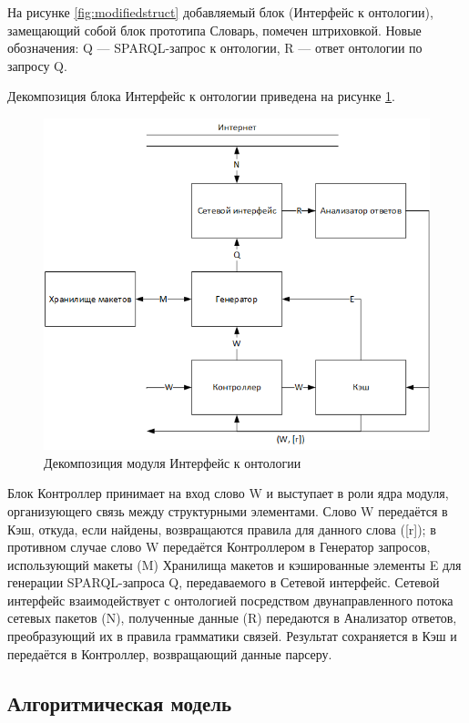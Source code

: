 На рисунке \ref{fig:modifiedstruct} добавляемый блок (Интерфейс к онтологии), замещающий собой блок прототипа Словарь, помечен штриховкой. Новые обозначения: Q --- SPARQL-запрос к онтологии, R --- ответ онтологии по запросу Q.

Декомпозиция блока Интерфейс к онтологии приведена на рисунке \ref{fig:decomposedstruct}.

\begin{figure}[H]
	\centering
		\includegraphics[scale=1.0]{images/decomposedstructure.png}
	\caption{\small Декомпозиция модуля Интерфейс к онтологии}
	\label{fig:decomposedstruct}
\end{figure}

Блок Контроллер принимает на вход слово W и выступает в роли ядра модуля, организующего связь между структурными элементами. Слово W передаётся в Кэш, откуда, если найдены, возвращаются правила для данного слова ([r]); в противном случае слово W передаётся Контроллером в Генератор запросов, использующий макеты (M) Хранилища макетов и кэшированные элементы E для генерации SPARQL-запроса Q, передаваемого в Сетевой интерфейс. Сетевой интерфейс взаимодействует с онтологией посредством двунаправленного потока сетевых пакетов (N), полученные данные (R) передаются в Анализатор ответов, преобразующий их в правила грамматики связей. Результат сохраняется в Кэш и передаётся в  Контроллер, возвращающий данные парсеру.

\subsection{Алгоритмическая модель}

